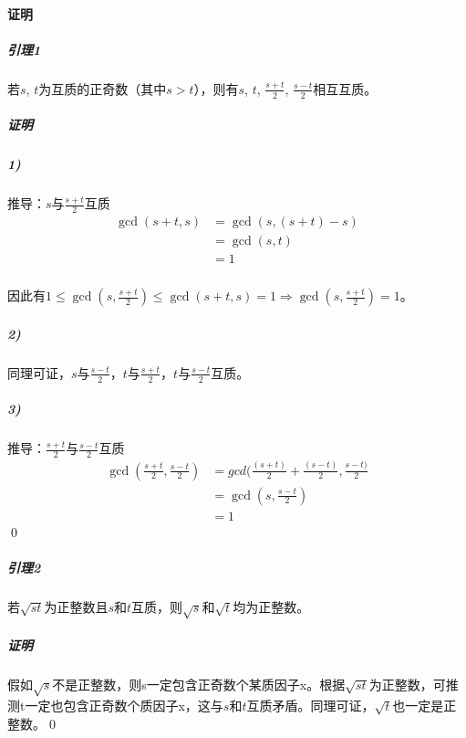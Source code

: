 \documentclass[UTF8]{ctexart}
\begin{document}
	\paragraph{证明}
		\subparagraph{引理1} 若$s$, $t$为互质的正奇数（其中$s>t$），则有$s$, $t$, $\frac{s+t}{2}$, $\frac{s-t}{2}$相互互质。
		\subparagraph{证明}
		\subparagraph{1)}推导：$s$与$\frac{s+t}{2}$互质
		\[
			\begin{aligned}
				\gcd(s+t,s)&=\gcd(s,(s+t)-s)\\
				           &=\gcd(s,t)\\
						   &=1
			\end{aligned}
		\]
		\subparagraph{}因此有$1{\leq}\gcd(s,\frac{s+t}{2}){\leq}\gcd(s+t,s)=1{\Rightarrow}\gcd(s,\frac{s+t}{2})=1$。
		\subparagraph{2)}同理可证，$s$与$\frac{s-t}{2}$，$t$与$\frac{s+t}{2}$，$t$与$\frac{s-t}{2}$互质。
		\subparagraph{3)}推导：$\frac{s+t}{2}$与$\frac{s-t}{2}$互质
		\[
			\begin{aligned}
				\gcd(\frac{s+t}{2},\frac{s-t}{2})&=gcd(\frac{(s+t)}{2}+\frac{(s-t)}{2},\frac{s-t)}{2}\\
				                                 &=\gcd(s,\frac{s-t}{2})\\
							                     &=1
			\end{aligned}
		\]\qed
		
		\subparagraph{引理2} 若$\sqrt{st}$为正整数且$s$和$t$互质，则$\sqrt{s}$和$\sqrt{t}$均为正整数。
		\subparagraph{证明} 假如$\sqrt{s}$不是正整数，则s一定包含正奇数个某质因子x。根据$\sqrt{st}$为正整数，可推测t一定也包含正奇数个质因子x，这与$s$和$t$互质矛盾。同理可证，$\sqrt{t}$也一定是正整数。\qed
	
\end{document}
